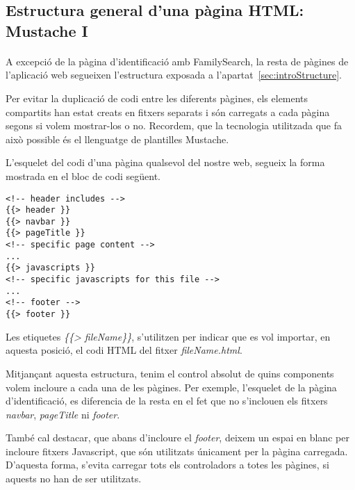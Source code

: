 \subsection{Estructura general d'una pàgina HTML: Mustache I}

    \paragraph{}
    A excepció de la pàgina d'identificació amb FamilySearch, la resta de pàgines de l'aplicació web segueixen l'estructura exposada a l'apartat~\ref{sec:introStructure}.

    Per evitar la duplicació de codi entre les diferents pàgines, els elements compartits han estat creats en fitxers separats i són carregats a cada pàgina segons si volem mostrar-los o no. Recordem, que la tecnologia utilitzada que fa això possible és el llenguatge de plantilles Mustache.

    L'esquelet del codi d'una pàgina qualsevol del nostre web, segueix la forma mos\-tra\-da en el bloc de codi següent.

    \begin{lstlisting}[style=rawOwn,caption={Exemple d'inclusió de fitxers HTML amb Mustache}]
<!-- header includes -->
{{> header }}
{{> navbar }}
{{> pageTitle }}
<!-- specific page content -->
...
{{> javascripts }}
<!-- specific javascripts for this file -->
...
<!-- footer -->
{{> footer }}
    \end{lstlisting}

    Les etiquetes \emph{\{\{> fileName\}\}}, s'utilitzen per indicar que es vol importar, en aquesta posició, el codi HTML del fitxer \emph{fileName.html}.

    Mitjançant aquesta estructura, tenim el control absolut de quins components volem incloure a cada una de les pàgines. Per exemple, l'esquelet de la pàgina d'identificació, es diferencia de la resta en el fet que no s'inclouen els fitxers \emph{navbar}, \emph{pageTitle} ni \emph{footer}.

    També cal destacar, que abans d'incloure el \emph{footer}, deixem un espai en blanc per incloure fitxers Javascript, que són utilitzats únicament per la pàgina carregada. D'aquesta forma, s'evita carregar tots els controladors a totes les pàgines, si aquests no han de ser utilitzats.
